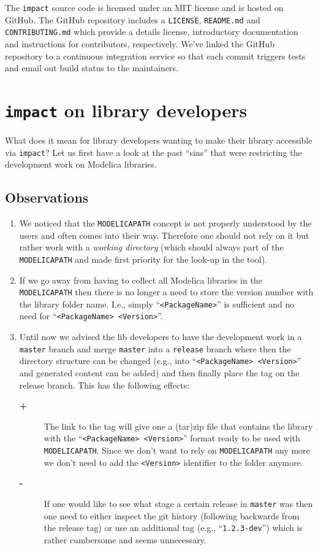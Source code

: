 \documentclass[11pt,a4paper,twocolumn]{article}
\newcommand{\code}[1]{\texttt{#1}} %
\begin{document}
The \code{impact} source code is licensed under an MIT license and is
hosted on GitHub.  The GitHub repository includes a \code{LICENSE},
\code{README.md} and \code{CONTRIBUTING.md} which provide a details
license, introductory documentation and instructions for contributors,
respectively.  We've linked the GitHub repository to a continuous
integration service so that each commit triggers tests and email out
build status to the maintainers.

\section{\code{impact} on library developers}

What does it mean for library developers wanting to make their library
accessible via \code{impact}? Let us first have a look at the past
``sins'' that were restricting the development work on Modelica
libraries.

\subsection{Observations}
\begin{enumerate}
\item  We noticed that the \texttt{MODELICAPATH} concept is not properly
  understood  by the users and often comes into their way.
Therefore one should not rely on it but rather work with a
\emph{working directory} (which should always part of the
\texttt{MODELICAPATH} and made first priority for the look-up in the
tool).
\item  If we go away from having to collect all Modelica libraries
in the \texttt{MODELICAPATH}  then there is no longer a need to store the
  version number with the library folder name.
I.e., simply ``\texttt{<PackageName>}'' is sufficient and no need for
``\texttt{<PackageName>~<Version>}''.
\item  Until now we advised the lib developers to have the development
  work in a \texttt{master} branch and merge \texttt{master} into a
  \texttt{release} branch where then the directory structure can be
  changed (e.g., into ``\texttt{<PackageName> <Version>}'' and
  generated content can be added) and then finally place the tag on
  the release branch. This has the following effects:
  \begin{description}
  \item[\textbf{+}] The link to the tag will give one a (tar)zip file
    that contains the library with the
    ``\texttt{<PackageName>~<Version>}'' format ready to be used with
    \texttt{MODELICAPATH}. Since we don't want to rely on
    \texttt{MODELICAPATH} any more we don't need to add the
    \texttt{<Version>} identifier to the folder anymore.
  \item[\textbf{-}] If one would like to see what stage a certain
    release in \texttt{master} was then one need to either inspect the
    git history (following backwards from the release tag) or use an
    additional tag (e.g., ``\texttt{1.2.3-dev}'') which is rather
    cumbersome and seems unnecessary.
  \end{description}
\end{enumerate}
\end{document}
